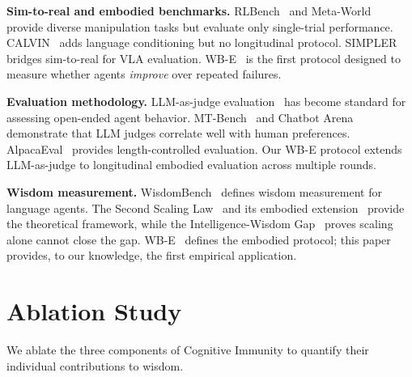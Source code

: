 ﻿\documentclass{article}
\begin{document}
\textbf{Sim-to-real and embodied benchmarks.}
RLBench~\citep{james2020rlbench} and Meta-World~\citep{yu2020metaworld} provide diverse manipulation tasks but evaluate only single-trial performance.
CALVIN~\citep{mees2022calvin} adds language conditioning but no longitudinal protocol.
SIMPLER~\citep{li2024simpler} bridges sim-to-real for VLA evaluation.
WB-E~\citep{sovereign2026p6} is the first protocol designed to measure whether agents \emph{improve} over repeated failures.

\textbf{Evaluation methodology.}
LLM-as-judge evaluation~\citep{zheng2024judging} has become standard for assessing open-ended agent behavior.
MT-Bench~\citep{zheng2024judging} and Chatbot Arena~\citep{chiang2024chatbot} demonstrate that LLM judges correlate well with human preferences.
AlpacaEval~\citep{li2024alpacaeval} provides length-controlled evaluation.
Our WB-E protocol extends LLM-as-judge to longitudinal embodied evaluation across multiple rounds.

\textbf{Wisdom measurement.}
WisdomBench~\citep{sovereign2026p2} defines wisdom measurement for language agents.
The Second Scaling Law~\citep{sovereign2026p4} and its embodied extension~\citep{sovereign2026p5} provide the theoretical framework, while the Intelligence-Wisdom Gap~\citep{sovereign2026p3} proves scaling alone cannot close the gap.
WB-E~\citep{sovereign2026p6} defines the embodied protocol; this paper provides, to our knowledge, the first empirical application.

\section{Ablation Study}
\label{sec:ablation}

We ablate the three components of Cognitive Immunity to quantify
their individual contributions to wisdom.
\end{document}
